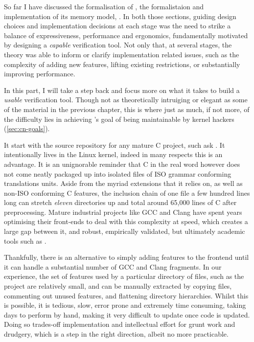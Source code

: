 So far I have discussed the formalisation of , the formalistaion and
implementation of its memory model, . In both those sections,
guiding design choices and implementation decisions at each stage was the need
to strike a balance of expressiveness, performance and ergonomics,
fundamentally motivated by designing a \emph{capable} verification tool. Not
only that, at several stages, the theory was able to inform or clarify
implementation related issues, such as the complexity of adding new features,
lifting existing restrictions, or substantially improving performance.

In this part, I will take a step back and focus more on what it takes to build
a \emph{usable} verification tool. Though not as theoretically intruiging or
elegant as some of the material in the previous chapter, this is where just as
much, if not more, of the difficulty lies in achieving 's goal of being
maintainable by kernel hackers (\cref{sec:cn-goals}).

It start with the source repository for any mature C project, such ask
. It intentionally lives in the Linux kernel, indeed in many respects
this is an advantage. It is an unignorable reminder that C in the real word
however does not come neatly packaged up into isolated files of ISO grammar
conforming translations units. Aside from the myriad extensions that it relies
on, as well as non-ISO conforming C features, the inclusion chain of one file a
few hundred lines long can stretch \emph{eleven} directories up and total
around 65,000 lines of C after preprocessing. Mature industrial projects like
GCC and Clang have spent years optimising their front-ends to deal with this
complexity at speed, which creates a large gap between it, and robust,
empirically validated, but ultimately academic tools such as .

Thankfully, there is an alternative to simply adding features to the
 frontend until it can handle a substantial number of GCC and
Clang fragments. In our experience, the set of features used by a particular
directory of files, such as the  project are relatively small, and can
be manually extracted by copying files, commenting out unused features, and
flattening directory hierarchies. Whilst this is possible, it is tedious, slow,
error prone and extremely time consuming, taking days to perform by hand,
making it very difficult to update once code is updated. Doing so trades-off
implementation and intellectual effort for grunt work and drudgery, which is a
step in the right direction, albeit no more practicable.

